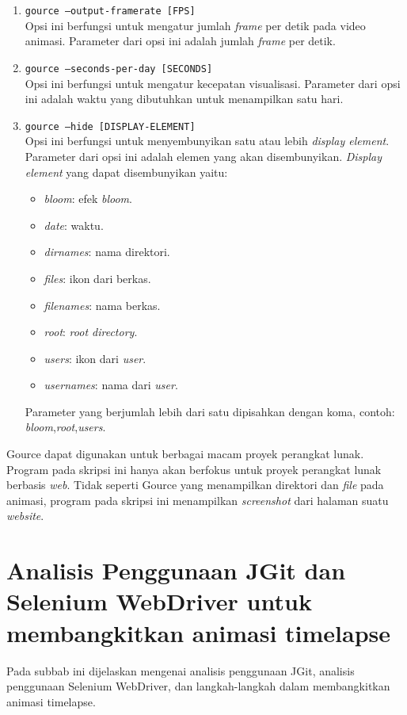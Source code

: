 \begin{enumerate}
\item \texttt{gource --output-framerate [FPS]}\\
Opsi ini berfungsi untuk mengatur jumlah \textit{frame} per detik pada video animasi. Parameter dari opsi ini adalah jumlah \textit{frame} per detik.

\item \texttt{gource --seconds-per-day [SECONDS]}\\
Opsi ini berfungsi untuk mengatur kecepatan visualisasi. Parameter dari opsi ini adalah waktu yang dibutuhkan untuk menampilkan satu hari.

\item \texttt{gource --hide [DISPLAY-ELEMENT]}\\
Opsi ini berfungsi untuk menyembunyikan satu atau lebih \textit{display element}. Parameter dari opsi ini adalah elemen yang akan disembunyikan. \textit{Display element} yang dapat disembunyikan yaitu:
\begin{itemize}
\item \textit{bloom}: efek \textit{bloom}. 
\item \textit{date}: waktu.  
\item \textit{dirnames}: nama direktori. 
\item \textit{files}: ikon dari berkas. 
\item \textit{filenames}: nama berkas. 
\item \textit{root}: \textit{root directory}.
\item \textit{users}: ikon dari \textit{user}.
\item \textit{usernames}: nama dari \textit{user}.
\end{itemize}
Parameter yang berjumlah lebih dari satu dipisahkan dengan koma, contoh: \textit{bloom},\textit{root},\textit{users}.
\end{enumerate}
 
Gource dapat digunakan untuk berbagai macam proyek perangkat lunak. Program pada skripsi ini hanya akan berfokus untuk proyek perangkat lunak berbasis \textit{web}. Tidak seperti Gource yang menampilkan direktori dan \textit{file} pada animasi, program pada skripsi ini menampilkan \textit{screenshot} dari halaman suatu \textit{website}.      
 
\section{Analisis Penggunaan JGit dan Selenium WebDriver untuk membangkitkan animasi timelapse}
\label{sec:analisis_jgit_selenium}
Pada subbab ini dijelaskan mengenai analisis penggunaan JGit, analisis penggunaan Selenium WebDriver, dan langkah-langkah dalam membangkitkan animasi timelapse. 

